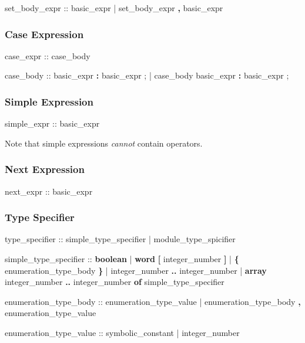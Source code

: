 \begin{Grammar}
set_body_expr :: 
        basic_expr
      | set_body_expr \textbf{,} basic_expr
\end{Grammar}


\subsubsection{Case Expression}
\begin{Grammar}
case_expr ::  case_body 

case_body ::
        basic_expr \textbf{:} basic_expr {;}
      | case_body basic_expr \textbf{:} basic_expr {;}
\end{Grammar}


\subsubsection{Simple Expression}
\begin{Grammar}
simple_expr :: basic_expr
\end{Grammar}

Note that simple expressions \emph{cannot} contain  operators.


\subsubsection{Next Expression}
\begin{Grammar}
next_expr :: basic_expr
\end{Grammar}


\subsubsection{Type Specifier}
\begin{Grammar}
type_specifier ::
        simple_type_specifier
      | module_type_spicifier

simple_type_specifier :: 
        \textbf{boolean}
      | \textbf{word} \textbf{[} integer_number \textbf{]} 
      | \textbf{\{} enumeration_type_body \textbf{\}}
      | integer_number \textbf{..} integer_number
      | \textbf{array} integer_number \textbf{..} integer_number
                 \textbf{of} simple_type_specifier

enumeration_type_body ::
        enumeration_type_value
      | enumeration_type_body \textbf{,} enumeration_type_value

enumeration_type_value ::
        symbolic_constant
      | integer_number
\end{Grammar}


